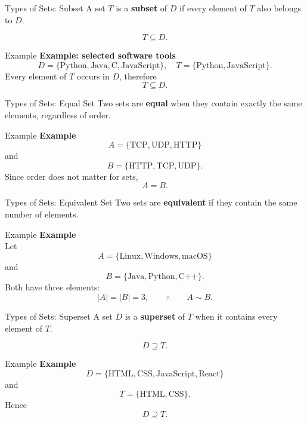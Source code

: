 \documentclass[aspectratio=169,11pt]{beamer}
\newcommand{\examplebox}[2]{
\begin{block}{Example}
\textbf{#1}\\[-1mm]
#2
\end{block}
}
\begin{document}
\begin{frame}{Types of Sets: Subset}
A set $T$ is a \textbf{subset} of $D$ if every element of $T$ also belongs to $D$.

\[
T\subseteq D.
\]

\examplebox{Example: selected software tools}{
\[
D=\{\text{Python},\text{Java},\text{C},\text{JavaScript}\},
\quad
T=\{\text{Python},\text{JavaScript}\}.
\]
Every element of $T$ occurs in $D$, therefore
\[
\boxed{T\subseteq D}.
\]
}
\end{frame}

\begin{frame}{Types of Sets: Equal Set}
Two sets are \textbf{equal} when they contain exactly the same elements, regardless of order.

\examplebox{Example}{
\[
A=\{\text{TCP},\text{UDP},\text{HTTP}\}
\]
and
\[
B=\{\text{HTTP},\text{TCP},\text{UDP}\}.
\]
Since order does not matter for sets,
\[
\boxed{A=B}.
\]
}
\end{frame}

\begin{frame}{Types of Sets: Equivalent Set}
Two sets are \textbf{equivalent} if they contain the same number of elements.

\examplebox{Example}{
Let
\[
A=\{\text{Linux},\text{Windows},\text{macOS}\}
\]
and
\[
B=\{\text{Java},\text{Python},\text{C++}\}.
\]
Both have three elements:
\[
|A|=|B|=3,
\qquad\therefore\qquad
\boxed{A\sim B}.
\]
}
\end{frame}

\begin{frame}{Types of Sets: Superset}
A set $D$ is a \textbf{superset} of $T$ when it contains every element of $T$.

\[
D\supseteq T.
\]

\examplebox{Example}{
\[
D=\{\text{HTML},\text{CSS},\text{JavaScript},\text{React}\}
\]
and
\[
T=\{\text{HTML},\text{CSS}\}.
\]
Hence
\[
\boxed{D\supseteq T}.
\]
}
\end{frame}
\end{document}
